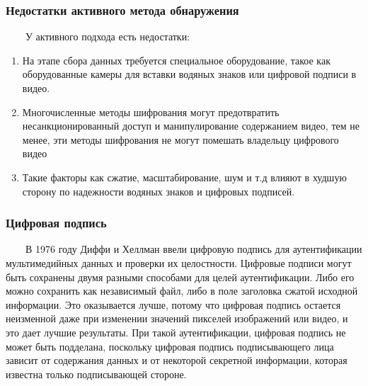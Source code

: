\documentclass[12pt]{article}
\begin{document}
    \subsubsection{Недостатки активного метода обнаружения}
        $\qquad$У активного подхода есть недостатки:
        \begin{enumerate}
            \item На этапе сбора данных требуется специальное оборудование, такое как оборудованные камеры для вставки водяных знаков или цифровой подписи в видео.
            \item  Многочисленные методы шифрования могут предотвратить несанкционированный доступ и манипулирование содержанием видео, тем не менее, эти методы шифрования не могут помешать владельцу цифрового видео
            \item Такие факторы как сжатие, масштабирование, шум и т.д влияют в худшую сторону по надежности водяных знаков и цифровых подписей.
        \end{enumerate}
    \subsubsection{Цифровая подпись}
        $\qquad$В 1976 году Диффи и Хеллман ввели цифровую подпись для аутентификации мультимедийных данных и проверки их целостности. Цифровые подписи могут быть сохранены двумя разными способами для целей аутентификации. Либо его можно сохранить как независимый файл, либо в поле заголовка сжатой исходной информации. Это оказывается лучше, потому что цифровая подпись остается неизменной даже при изменении значений пикселей изображений или видео, и это дает лучшие результаты. При такой аутентификации, цифровая подпись не может быть подделана, поскольку цифровая подпись подписывающего лица зависит от содержания данных и от некоторой секретной информации, которая известна только подписывающей стороне.
\end{document}
